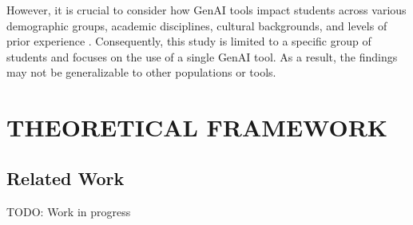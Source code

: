 \documentclass[a4paper,twoside]{article}
\begin{document}
However, it is crucial to consider how GenAI tools impact students across
various demographic groups, academic disciplines, cultural backgrounds, and
levels of prior experience \citep{catalan21} \citep{neo22}. Consequently, this
study is limited to a specific group of students and focuses on the use of a
single GenAI tool. As a result, the findings may not be generalizable to other
populations or tools.




\section{\uppercase{Theoretical Framework}}

\subsection{Related Work}

TODO: Work in progress

\end{document}
